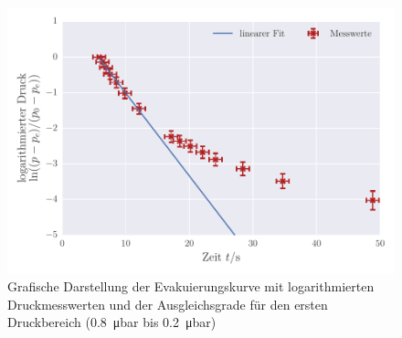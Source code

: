 \begin{figure}[!h]
 \centering
 \includegraphics[scale=0.8]{../Grafiken/Evakuierungskurve_Turbo_log_0.pdf}
 \caption{Grafische Darstellung der Evakuierungskurve mit logarithmierten Druckmesswerten und der Ausgleichsgrade für den ersten Druckbereich (\SI{0.8}{\micro\bar} bis \SI{0.2}{\micro\bar})\label{fig:evakuierungskurve_turbo_log_0}}
 \end{figure} 
